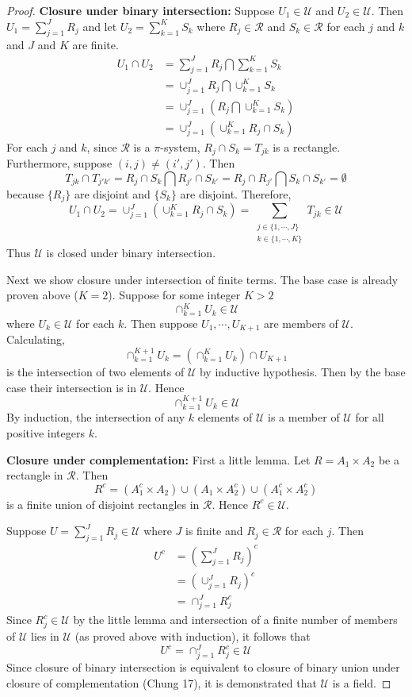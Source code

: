 \documentclass[letterpaper, 12pt]{article}
\newcommand{\cR}{\mathcal{R}}
\newcommand{\cU}{\mathcal{U}}
\begin{document}
\begin{enumerate}
\begin{enumerate}[(a)]
\begin{proof}
\textbf{Closure under binary intersection:}
Suppose $U_1 \in \cU$ and $U_2 \in \cU$. 
Then $U_1 = \sum_{j=1}^J R_j$ and let $U_2 = \sum_{k=1}^K S_k$ where $R_j \in \cR$ and $S_k \in \cR$ for each $j$ and $k$ and $J$ and $K$ are finite.
\begin{align*}
U_1 \cap U_2 
&=
\sum_{j=1}^J R_j
\bigcap
\sum_{k=1}^K S_k
\\
&=
\cup_{j=1}^J R_j
\bigcap
\cup_{k=1}^K S_k
\\
&=
\cup_{j=1}^J 
\left(
R_j 
\bigcap \cup_{k=1}^K S_k
\right)
\\
&=
\cup_{j=1}^J 
\left(
\cup_{k=1}^K
R_j 
\cap S_k
\right)
\end{align*}
For each $j$ and $k$, since $\cR$ is a $\pi$-system,
$R_j \cap S_k = T_{jk}$ is a rectangle. Furthermore,
suppose $(i,j) \neq (i',j')$. Then
\[
T_{jk} \cap T_{j'k'}=
R_j \cap S_k
\bigcap
R_{j'} \cap S_{k'}
=
R_j \cap R_{j'}
\bigcap
S_{k} \cap S_{k'}
= \emptyset
\] 
because $\{R_j\}$ are disjoint and $\{S_k\}$ are disjoint.
Therefore, 
\[
U_1 \cap U_2 = 
\cup_{j=1}^J 
\left(
\cup_{k=1}^K
R_j 
\cap S_k
\right)
=
\sum_{\substack{j \in \{1, \cdots, J\} \\ k \in \{1, \cdots, K\}}}
T_{jk}
\in 
\cU
\]
Thus $\cU$ is closed under binary intersection. 

Next we show closure under intersection of finite terms. The base case is already proven above ($K=2$). Suppose for some integer $K > 2$
\[
\cap_{k=1}^K U_k \in \cU
\]
where $U_k \in \cU$ for each $k$. Then suppose $U_1, \cdots, U_{K+1}$ are members of $\cU$. Calculating,
\[
\cap_{k=1}^{K+1} U_k 
= 
\left(
\cap_{k=1}^{K} U_k 
\right) \cap U_{K+1}
\]
is the intersection of two elements of $\cU$ by inductive hypothesis. Then by the base case their intersection is in
$\cU$. Hence
\[
\cap_{k=1}^{K+1} U_k  \in \cU
\]
By induction, the intersection of any $k$ elements of $\cU$ is a member of $\cU$ for all positive integers $k$.

\textbf{Closure under complementation:}
First a little lemma. 
Let $R = A_1 \times A_2$ be a rectangle in $\cR$. 
Then 
\[
R^c = (A_1^c \times A_2) \cup (A_1 \times A^c_2) \cup (A_1^c \times A_2^c)
\]
is a finite union of disjoint rectangles in $\cR$. Hence $R^c \in \cU$.

Suppose $U = \sum_{j=1}^J R_j \in \cU$ where $J$ is finite and $R_j \in \cR$ for each $j$. Then
\begin{align*}
U^c &= 
\left(
\sum_{j=1}^J R_j
\right)^c
\\
&=
\left(
\cup_{j=1}^J R_j
\right)^c
\\
&=
\cap_{j=1}^J R_j^c
\end{align*}
Since $R_j^c \in \cU$ by the little lemma and intersection of a finite number of members of $\cU$ lies in $\cU$ (as proved above with induction), it follows that
\[
U^c = \cap_{j=1}^J R_j^c \in \cU
\]  
Since closure of binary intersection is equivalent to closure of binary union under closure of complementation (Chung 17), it is demonstrated that $\cU$ is a field.


\end{proof}
\end{enumerate}
\end{enumerate}
\end{document}
